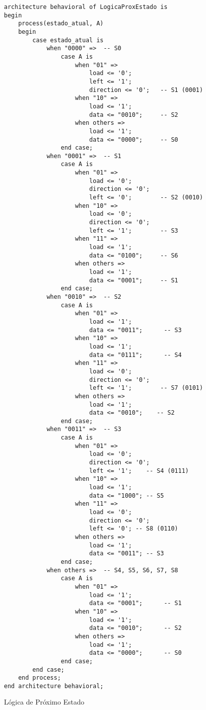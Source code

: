 \documentclass[a4paper,12pt]{article}
\newenvironment{code}{\captionsetup{type=listing}}{}
\begin{document}
\begin{code}
\begin{verbatim}
architecture behavioral of LogicaProxEstado is
begin
    process(estado_atual, A)
    begin
        case estado_atual is
            when "0000" =>  -- S0
                case A is
                    when "01" =>
                        load <= '0';
                        left <= '1';
                        direction <= '0';   -- S1 (0001)
                    when "10" =>
                        load <= '1';
                        data <= "0010";     -- S2
                    when others =>
                        load <= '1';
                        data <= "0000";     -- S0
                end case;
            when "0001" =>  -- S1
                case A is
                    when "01" =>
                        load <= '0';
                        direction <= '0';
                        left <= '0';        -- S2 (0010)
                    when "10" =>
                        load <= '0';
                        direction <= '0';
                        left <= '1';        -- S3
                    when "11" =>
                        load <= '1';
                        data <= "0100";     -- S6
                    when others =>
                        load <= '1';
                        data <= "0001";     -- S1
                end case;
            when "0010" =>  -- S2
                case A is
                    when "01" =>
                        load <= '1';
                        data <= "0011";      -- S3
                    when "10" =>
                        load <= '1';
                        data <= "0111";      -- S4
                    when "11" =>
                        load <= '0';
                        direction <= '0';
                        left <= '1';        -- S7 (0101)
                    when others =>
                        load <= '1';
                        data <= "0010";    -- S2
                end case;
            when "0011" =>  -- S3
                case A is
                    when "01" =>
                        load <= '0';
                        direction <= '0';
                        left <= '1';    -- S4 (0111)
                    when "10" =>
                        load <= '1';
                        data <= "1000"; -- S5
                    when "11" =>
                        load <= '0';
                        direction <= '0';
                        left <= '0'; -- S8 (0110)
                    when others =>
                        load <= '1';
                        data <= "0011"; -- S3
                end case;
            when others =>  -- S4, S5, S6, S7, S8
                case A is
                    when "01" =>
                        load <= '1';
                        data <= "0001";      -- S1
                    when "10" =>
                        load <= '1';
                        data <= "0010";      -- S2
                    when others =>
                        load <= '1';
                        data <= "0000";      -- S0
                end case;
        end case;
    end process;
end architecture behavioral;
    \end{verbatim}
    \caption{Lógica de Próximo Estado}
\end{code}
\end{document}
